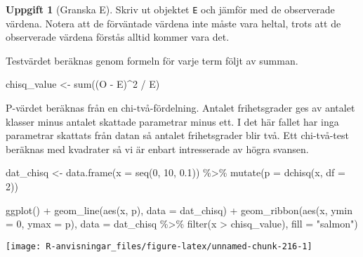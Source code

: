 \documentclass[
]{book}
\newenvironment{Shaded}{\begin{snugshade}}{\end{snugshade}}
\newcommand{\AttributeTok}[1]{\textcolor[rgb]{0.77,0.63,0.00}{#1}}
\newcommand{\DecValTok}[1]{\textcolor[rgb]{0.00,0.00,0.81}{#1}}
\newcommand{\FloatTok}[1]{\textcolor[rgb]{0.00,0.00,0.81}{#1}}
\newcommand{\FunctionTok}[1]{\textcolor[rgb]{0.00,0.00,0.00}{#1}}
\newcommand{\NormalTok}[1]{#1}
\newcommand{\OtherTok}[1]{\textcolor[rgb]{0.56,0.35,0.01}{#1}}
\newcommand{\SpecialCharTok}[1]{\textcolor[rgb]{0.00,0.00,0.00}{#1}}
\newcommand{\StringTok}[1]{\textcolor[rgb]{0.31,0.60,0.02}{#1}}
\theoremstyle{definition}
\theoremstyle{definition}
\theoremstyle{definition}
\newtheorem{exercise}{Uppgift}[chapter]
\theoremstyle{definition}
\theoremstyle{remark}
\begin{document}
\begin{exercise}[Granska E]
Skriv ut objektet \texttt{E} och jämför med de observerade värdena. Notera att de förväntade värdena inte måste vara heltal, trots att de observerade värdena förstås alltid kommer vara det.
\end{exercise}

Testvärdet beräknas genom formeln för varje term följt av summan.

\begin{Shaded}
\begin{Highlighting}[]
\NormalTok{chisq\_value }\OtherTok{\textless{}{-}} \FunctionTok{sum}\NormalTok{((O }\SpecialCharTok{{-}}\NormalTok{ E)}\SpecialCharTok{\^{}}\DecValTok{2} \SpecialCharTok{/}\NormalTok{ E)}
\end{Highlighting}
\end{Shaded}

P-värdet beräknas från en chi-två-fördelning. Antalet frihetsgrader ges av antalet klasser minus antalet skattade parametrar minus ett. I det här fallet har inga parametrar skattats från datan så antalet frihetsgrader blir två. Ett chi-två-test beräknas med kvadrater så vi är enbart intresserade av högra svansen.

\begin{Shaded}
\begin{Highlighting}[]
\NormalTok{dat\_chisq }\OtherTok{\textless{}{-}} \FunctionTok{data.frame}\NormalTok{(}\AttributeTok{x =} \FunctionTok{seq}\NormalTok{(}\DecValTok{0}\NormalTok{, }\DecValTok{10}\NormalTok{, }\FloatTok{0.1}\NormalTok{)) }\SpecialCharTok{\%\textgreater{}\%} 
  \FunctionTok{mutate}\NormalTok{(}\AttributeTok{p =} \FunctionTok{dchisq}\NormalTok{(x, }\AttributeTok{df =} \DecValTok{2}\NormalTok{))}

\FunctionTok{ggplot}\NormalTok{() }\SpecialCharTok{+}
  \FunctionTok{geom\_line}\NormalTok{(}\FunctionTok{aes}\NormalTok{(x, p), }\AttributeTok{data =}\NormalTok{ dat\_chisq) }\SpecialCharTok{+}
  \FunctionTok{geom\_ribbon}\NormalTok{(}\FunctionTok{aes}\NormalTok{(x, }\AttributeTok{ymin =} \DecValTok{0}\NormalTok{, }\AttributeTok{ymax =}\NormalTok{ p), }\AttributeTok{data =}\NormalTok{ dat\_chisq }\SpecialCharTok{\%\textgreater{}\%} \FunctionTok{filter}\NormalTok{(x }\SpecialCharTok{\textgreater{}}\NormalTok{ chisq\_value), }\AttributeTok{fill =} \StringTok{"salmon"}\NormalTok{)}
\end{Highlighting}
\end{Shaded}

\begin{center}\texttt{[image: R-anvisningar\_files/figure-latex/unnamed-chunk-216-1]} \end{center}
\end{document}
